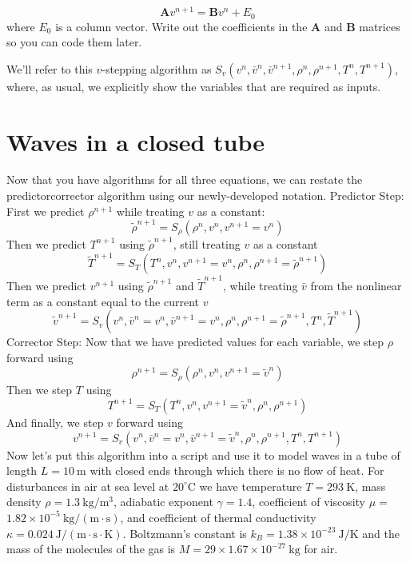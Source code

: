 \begin{equation*}
\mathbf{A} v^{n+1}=\mathbf{B} v^{n}+E_{0}
\end{equation*}
where $E_{0}$ is a column vector. Write out the coefficients in the $\mathbf{A}$ and $\mathbf{B}$ matrices so you can code them later.

We\rq ll refer to this $v$-stepping algorithm as $S_{v}\left(v^{n}, \bar{v}^{n}, \bar{v}^{n+1}, \rho^{n}, \rho^{n+1}, T^{n}, T^{n+1}\right)$, where, as usual, we explicitly show the variables that are required as inputs.
\section*{Waves in a closed tube}

Now that you have algorithms for all three equations, we can restate the predictorcorrector algorithm using our newly-developed notation.
Predictor Step: First we predict $\rho^{n+1}$ while treating $v$ as a constant:
$$
\tilde{\rho}^{n+1}=S_{\rho}\left(\rho^{n}, v^{n}, v^{n+1}=v^{n}\right)
$$
Then we predict $T^{n+1}$ using $\tilde{\rho}^{n+1}$, still treating $v$ as a constant
$$
\tilde{T}^{n+1}=S_{T}\left(T^{n}, v^{n}, v^{n+1}=v^{n}, \rho^{n}, \rho^{n+1}=\tilde{\rho}^{n+1}\right)
$$
Then we predict $v^{n+1}$ using $\tilde{\rho}^{n+1}$ and $\tilde{T}^{n+1}$, while treating $\bar{v}$ from the nonlinear term as a constant equal to the current $v$
$$
\tilde{v}^{n+1}=S_{v}\left(v^{n}, \bar{v}^{n}=v^{n}, \bar{v}^{n+1}=v^{n}, \rho^{n}, \rho^{n+1}=\tilde{\rho}^{n+1}, T^{n}, \tilde{T}^{n+1}\right)
$$
Corrector Step: Now that we have predicted values for each variable, we step $\rho$ forward using
$$
\rho^{n+1}=S_{\rho}\left(\rho^{n}, v^{n}, v^{n+1}=\tilde{v}^{n}\right)
$$
Then we step $T$ using
$$
T^{n+1}=S_{T}\left(T^{n}, v^{n}, v^{n+1}=\tilde{v}^{n}, \rho^{n}, \rho^{n+1}\right)
$$
And finally, we step $v$ forward using
$$
v^{n+1}=S_{v}\left(v^{n}, \bar{v}^{n}=v^{n}, \bar{v}^{n+1}=\tilde{v}^{n}, \rho^{n}, \rho^{n+1}, T^{n}, T^{n+1}\right)
$$
Now let\rq s put this algorithm into a script and use it to model waves in a tube of length $L=10 \mathrm{~m}$ with closed ends through which there is no flow of heat. For disturbances in air at sea level at $20^{\circ} \mathrm{C}$ we have temperature $T=293 \mathrm{~K}$, mass density $\rho=1.3 \mathrm{~kg} / \mathrm{m}^{3}$, adiabatic exponent $\gamma=1.4$, coefficient of viscosity $\mu=$ $1.82 \times 10^{-5} \mathrm{~kg} /(\mathrm{m} \cdot \mathrm{s})$, and coefficient of thermal conductivity $\kappa=0.024 \mathrm{~J} /(\mathrm{m} \cdot \mathrm{s} \cdot \mathrm{K})$. Boltzmann\rq s constant is $k_{B}=1.38 \times 10^{-23} \mathrm{~J} / \mathrm{K}$ and the mass of the molecules of the gas is $M=29 \times 1.67 \times 10^{-27} \mathrm{~kg}$ for air.

